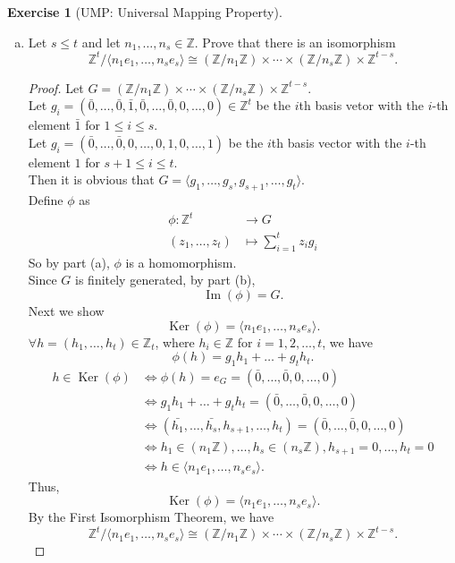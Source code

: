 \documentclass{article}
\newcommand{\bbz}{\mathbb{Z}}
\renewcommand{\ker}{\operatorname{Ker}}
\newcommand{\im}{\operatorname{Im}}
\theoremstyle{plain}
\theoremstyle{definition}
\newtheorem{exer}[lem]{Exercise}
\begin{document}
\begin{exer}[UMP: Universal Mapping Property]
\begin{enumerate}[(a)]
\begin{enumerate}[(i)]
\end{enumerate}
\item Let $s\leq t$ and let $n_1,\ldots,n_s\in\bbz$. 
Prove that 
there is an isomorphism $$\bbz^t/\langle n_1e_1,\ldots,n_se_s\rangle\cong(\bbz/n_1\bbz)\times\cdots\times(\bbz/n_s\bbz)\times\bbz^{t-s}.$$
\begin{proof}
  	Let $G = (\bbz/n_1\bbz)\times\cdots\times(\bbz/n_s\bbz)\times\bbz^{t-s}$.\\
  	Let $g_i = (\bar{0},\ldots,\bar{0},\bar{1},\bar{0},\ldots,\bar{0},0,\ldots,0)\in \bbz^t$ be the $i$th basis vetor with the $i$-th element $\bar{1}$ for $1 \leq i \leq s$.\\
  	Let $g_i = (\bar{0},\ldots,\bar{0},0,\ldots,0,1,0,\ldots,1)$ be the $i$th basis vector with the $i$-th element $1$ for $s+1 \leq i \leq t$.\\
  	Then it is obvious that $G = \langle g_1,\ldots,g_s,g_{s+1},\ldots,g_t \rangle$.\\
  Define $\phi$ as
  \begin{align*}
  	\phi: \bbz^t &\to G \\
  			(z_1,\dots,z_t) & \mapsto \sum_{i=1}^tz_ig_i 
  \end{align*}
	So by part (a), $\phi$ is a homomorphism.\\
	Since $G$ is finitely generated, by part (b),
	\[\im(\phi) = G.\]
	Next we show 
	\[\ker(\phi) = \langle n_1e_1,\ldots,n_se_s \rangle.\]
	$\forall h=(h_1,\ldots,h_t)\in \bbz_t$, where $h_i \in \bbz$ for $i = 1,2,\ldots,t$, we have
	\[\phi(h) = g_1{h_1}+\ldots +g_t{h_t}.\]
  	\begin{align*}
  	  h \in \ker(\phi) &\Leftrightarrow \phi(h) = e_G = (\bar{0},\ldots,\bar{0},0,\ldots,0) \\   
  	 			     				   	  &\Leftrightarrow g_1{h_1}+\ldots +g_t{h_t} = (\bar{0},\ldots,\bar{0},0,\ldots,0) \\
  	 			     				   	  &\Leftrightarrow (\bar{h_1},\ldots,\bar{h_s},h_{s+1},\ldots,h_t) = (\bar{0},\ldots,\bar{0},0,\ldots,0) \\
  	  					  			      &\Leftrightarrow h_1 \in (n_1\bbz),\ldots,h_s \in (n_s\bbz),h_{s+1} = 0,\ldots,h_{t} = 0 \\
  	  									  &\Leftrightarrow h  \in \langle n_1e_1,\ldots,n_se_s \rangle.
  	\end{align*}
    Thus,
    \[\ker(\phi) = \langle n_1e_1,\ldots,n_se_s \rangle.\]
    By the First Isomorphism Theorem, we have
    \[\bbz^t/\langle n_1e_1,\ldots,n_se_s\rangle\cong(\bbz/n_1\bbz)\times\cdots\times(\bbz/n_s\bbz)\times\bbz^{t-s}.\]
\end{proof}

\end{enumerate}
\end{exer}
\end{document}
